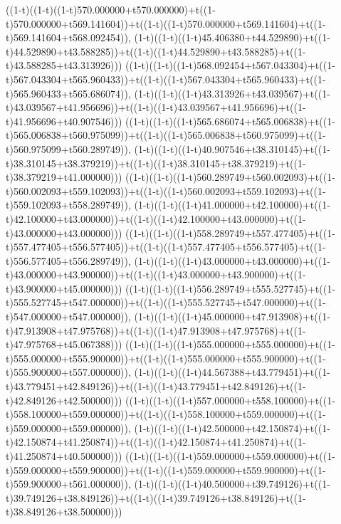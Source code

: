 ((1-t)((1-t)((1-t)570.000000+t570.000000)+t((1-t)570.000000+t569.141604))+t((1-t)((1-t)570.000000+t569.141604)+t((1-t)569.141604+t568.092454)),                                     (1-t)((1-t)((1-t)45.406380+t44.529890)+t((1-t)44.529890+t43.588285))+t((1-t)((1-t)44.529890+t43.588285)+t((1-t)43.588285+t43.313926)))
((1-t)((1-t)((1-t)568.092454+t567.043304)+t((1-t)567.043304+t565.960433))+t((1-t)((1-t)567.043304+t565.960433)+t((1-t)565.960433+t565.686074)),                                     (1-t)((1-t)((1-t)43.313926+t43.039567)+t((1-t)43.039567+t41.956696))+t((1-t)((1-t)43.039567+t41.956696)+t((1-t)41.956696+t40.907546)))
((1-t)((1-t)((1-t)565.686074+t565.006838)+t((1-t)565.006838+t560.975099))+t((1-t)((1-t)565.006838+t560.975099)+t((1-t)560.975099+t560.289749)),                                     (1-t)((1-t)((1-t)40.907546+t38.310145)+t((1-t)38.310145+t38.379219))+t((1-t)((1-t)38.310145+t38.379219)+t((1-t)38.379219+t41.000000)))
((1-t)((1-t)((1-t)560.289749+t560.002093)+t((1-t)560.002093+t559.102093))+t((1-t)((1-t)560.002093+t559.102093)+t((1-t)559.102093+t558.289749)),                                     (1-t)((1-t)((1-t)41.000000+t42.100000)+t((1-t)42.100000+t43.000000))+t((1-t)((1-t)42.100000+t43.000000)+t((1-t)43.000000+t43.000000)))
((1-t)((1-t)((1-t)558.289749+t557.477405)+t((1-t)557.477405+t556.577405))+t((1-t)((1-t)557.477405+t556.577405)+t((1-t)556.577405+t556.289749)),                                     (1-t)((1-t)((1-t)43.000000+t43.000000)+t((1-t)43.000000+t43.900000))+t((1-t)((1-t)43.000000+t43.900000)+t((1-t)43.900000+t45.000000)))
((1-t)((1-t)((1-t)556.289749+t555.527745)+t((1-t)555.527745+t547.000000))+t((1-t)((1-t)555.527745+t547.000000)+t((1-t)547.000000+t547.000000)),                                     (1-t)((1-t)((1-t)45.000000+t47.913908)+t((1-t)47.913908+t47.975768))+t((1-t)((1-t)47.913908+t47.975768)+t((1-t)47.975768+t45.067388)))
((1-t)((1-t)((1-t)555.000000+t555.000000)+t((1-t)555.000000+t555.900000))+t((1-t)((1-t)555.000000+t555.900000)+t((1-t)555.900000+t557.000000)),                                     (1-t)((1-t)((1-t)44.567388+t43.779451)+t((1-t)43.779451+t42.849126))+t((1-t)((1-t)43.779451+t42.849126)+t((1-t)42.849126+t42.500000)))
((1-t)((1-t)((1-t)557.000000+t558.100000)+t((1-t)558.100000+t559.000000))+t((1-t)((1-t)558.100000+t559.000000)+t((1-t)559.000000+t559.000000)),                                     (1-t)((1-t)((1-t)42.500000+t42.150874)+t((1-t)42.150874+t41.250874))+t((1-t)((1-t)42.150874+t41.250874)+t((1-t)41.250874+t40.500000)))
((1-t)((1-t)((1-t)559.000000+t559.000000)+t((1-t)559.000000+t559.900000))+t((1-t)((1-t)559.000000+t559.900000)+t((1-t)559.900000+t561.000000)),                                     (1-t)((1-t)((1-t)40.500000+t39.749126)+t((1-t)39.749126+t38.849126))+t((1-t)((1-t)39.749126+t38.849126)+t((1-t)38.849126+t38.500000)))
